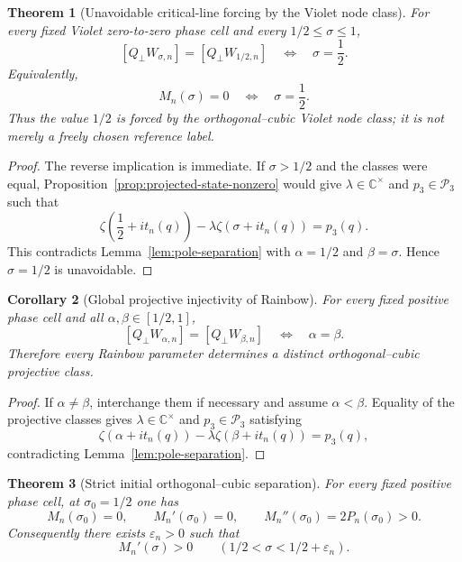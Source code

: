 \documentclass[11pt]{amsart}
\numberwithin{equation}{section}
\newtheorem{theorem}{Theorem}[section]
\newtheorem{corollary}[theorem]{Corollary}
\newcommand{\C}{\mathbb C}
\begin{document}
\begin{theorem}[Unavoidable critical-line forcing by the Violet node class]
\label{thm:critical-line-forcing}
For every fixed Violet zero-to-zero phase cell and every
$1/2\le\sigma\le1$,
\begin{equation}
\boxed{
[Q_\perp W_{\sigma,n}]
=[Q_\perp W_{1/2,n}]
\quad\Longleftrightarrow\quad
\sigma=\frac12.
}
\label{eq:critical-line-forcing}
\end{equation}
Equivalently,
\begin{equation}
\boxed{M_n(\sigma)=0\quad\Longleftrightarrow\quad\sigma=\frac12.}
\label{eq:critical-M-forcing}
\end{equation}
Thus the value $1/2$ is forced by the orthogonal--cubic Violet node
class; it is not merely a freely chosen reference label.
\end{theorem}

\begin{proof}
The reverse implication is immediate.  If $\sigma>1/2$ and the classes
were equal, Proposition~\ref{prop:projected-state-nonzero} would give
$\lambda\in\C^\times$ and $p_3\in\mathcal P_3$ such that
\[
\zeta\!\left(\frac12+i t_n(q)\right)
-\lambda\zeta(\sigma+i t_n(q))=p_3(q).
\]
This contradicts Lemma~\ref{lem:pole-separation} with
$\alpha=1/2$ and $\beta=\sigma$.  Hence $\sigma=1/2$ is unavoidable.
\end{proof}

\begin{corollary}[Global projective injectivity of Rainbow]
\label{cor:global-projective-injectivity}
For every fixed positive phase cell and all $\alpha,\beta\in[1/2,1]$,
\begin{equation}
\boxed{
[Q_\perp W_{\alpha,n}]
=[Q_\perp W_{\beta,n}]
\quad\Longleftrightarrow\quad
\alpha=\beta.
}
\label{eq:global-projective-injectivity}
\end{equation}
Therefore every Rainbow parameter determines a distinct
orthogonal--cubic projective class.
\end{corollary}

\begin{proof}
If $\alpha\ne\beta$, interchange them if necessary and assume
$\alpha<\beta$.  Equality of the projective classes gives
$\lambda\in\C^\times$ and $p_3\in\mathcal P_3$ satisfying
\[
\zeta(\alpha+i t_n(q))-\lambda\zeta(\beta+i t_n(q))=p_3(q),
\]
contradicting Lemma~\ref{lem:pole-separation}.
\end{proof}

\begin{theorem}[Strict initial orthogonal--cubic separation]
\label{thm:strict-initial-separation}
For every fixed positive phase cell, at $\sigma_0=1/2$ one has
\begin{equation}
\boxed{
M_n(\sigma_0)=0,
\qquad
M_n'(\sigma_0)=0,
\qquad
M_n''(\sigma_0)=2P_n(\sigma_0)>0.
}
\label{eq:strict-initial-second-derivative}
\end{equation}
Consequently there exists $\varepsilon_n>0$ such that
\begin{equation}
\boxed{
M_n'(\sigma)>0
\qquad
(1/2<\sigma<1/2+\varepsilon_n).
}
\label{eq:strict-initial-monotonicity}
\end{equation}
\end{theorem}
\end{document}
